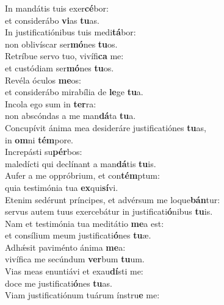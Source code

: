 \oddverse In mandátis tuis exer\textbf{cé}bor:~\*\\
\oddverse et considerábo \textbf{vi}as \textbf{tu}as.\\
\evenverse In justificatiónibus tuis medi\textbf{tá}bor:~\*\\
\evenverse non oblivíscar ser\textbf{mó}nes \textbf{tu}os.\\
\oddverse Retríbue servo tuo, vivífi\textbf{ca} me:~\*\\
\oddverse et custódiam ser\textbf{mó}nes \textbf{tu}os.\\
\evenverse Revéla óculos \textbf{me}os:~\*\\
\evenverse et considerábo mirabília de \textbf{le}ge \textbf{tu}a.\\
\oddverse Incola ego sum in \textbf{ter}ra:~\*\\
\oddverse non abscóndas a me man\textbf{dá}ta \textbf{tu}a.\\
\evenverse Concupívit ánima mea desideráre justificatiónes \textbf{tu}as,~\*\\
\evenverse in \textbf{om}ni \textbf{tém}pore.\\
\oddverse Increpásti su\textbf{pér}bos:~\*\\
\oddverse maledícti qui declínant a man\textbf{dá}tis \textbf{tu}is.\\
\evenverse Aufer a me oppróbrium, et con\textbf{tém}ptum:~\*\\
\evenverse quia testimónia tua \textbf{ex}qui\textbf{sí}vi.\\
\oddverse Etenim sedérunt príncipes, et advérsum me loque\textbf{bán}tur:~\*\\
\oddverse servus autem tuus exercebátur in justificati\textbf{ó}nibus \textbf{tu}is.\\
\evenverse Nam et testimónia tua meditátio \textbf{me}a est:~\*\\
\evenverse et consílium meum justificati\textbf{ó}nes \textbf{tu}æ.\\
\oddverse Adhǽsit paviménto ánima \textbf{me}a:~\*\\
\oddverse vivífica me secúndum \textbf{ver}bum \textbf{tu}um.\\
\evenverse Vias meas enuntiávi et exau\textbf{dí}sti me:~\*\\
\evenverse doce me justificati\textbf{ó}nes \textbf{tu}as.\\
\oddverse Viam justificatiónum tuárum ínstru\textbf{e} me:~\*\\
